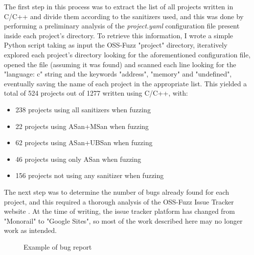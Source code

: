 The first step in this process was to extract the list of all projects written in C/C++ and divide them according to the sanitizers used, and this was done by performing a preliminary analysis of the \textit{project.yaml} configuration file present inside each project's directory. To retrieve this information, I wrote a simple Python script taking as input the OSS-Fuzz "project" directory, iteratively explored each project's directory looking for the aforementioned configuration file, opened the file (assuming it was found) and scanned each line looking for the "language: c" string and the keywords "address", "memory" and "undefined", eventually saving the name of each project in the appropriate list.
\newline \newline
This yielded a total of 524 projects out of 1277 written using C/C++, with: 
\begin{itemize}
    \item 238 projects using all sanitizers when fuzzing
    \item 22 projects using ASan+MSan when fuzzing
    \item 62 projects using ASan+UBSan when fuzzing
    \item 46 projects using only ASan when fuzzing
    \item 156 projects not using any sanitizer when fuzzing
\end{itemize}

The next step was to determine the number of bugs already found for each project, and this required a thorough analysis of the OSS-Fuzz Issue Tracker website \cite{ossfuzz_bugtracker}. At the time of writing, the issue tracker platform has changed from "Monorail" to "Google Sites", so most of the work described here may no longer work as intended.

\begin{figure}[h]
\caption{Example of bug report \cite{ossfuzz_bugtracker}}
\label{fig:issue}
\end{figure}

